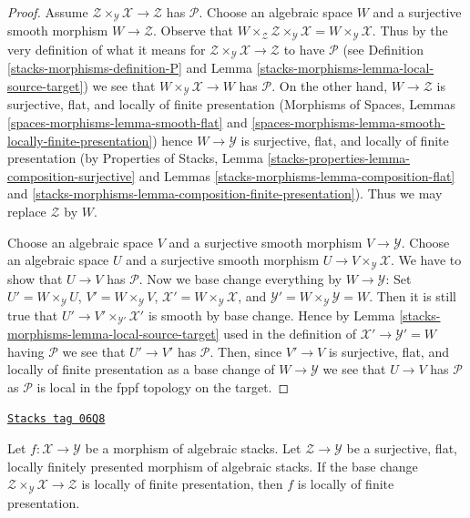 \begin{proof}
Assume $\mathcal{Z} \times_\mathcal{Y} \mathcal{X} \to \mathcal{Z}$
has $\mathcal{P}$. Choose an algebraic space $W$ and a surjective
smooth morphism $W \to \mathcal{Z}$. Observe that
$W \times_\mathcal{Z} \mathcal{Z} \times_\mathcal{Y} \mathcal{X} =
W \times_\mathcal{Y} \mathcal{X}$. Thus by the very definition of
what it means for $\mathcal{Z} \times_\mathcal{Y} \mathcal{X} \to \mathcal{Z}$
to have $\mathcal{P}$ (see Definition \ref{stacks-morphisms-definition-P}
and Lemma \ref{stacks-morphisms-lemma-local-source-target})
we see that $W \times_\mathcal{Y} \mathcal{X} \to W$
has $\mathcal{P}$. On the other hand, $W \to \mathcal{Z}$
is surjective, flat, and locally of finite presentation
(Morphisms of Spaces, Lemmas
\ref{spaces-morphisms-lemma-smooth-flat} and
\ref{spaces-morphisms-lemma-smooth-locally-finite-presentation})
hence $W \to \mathcal{Y}$ is surjective, flat, and locally of finite
presentation (by
Properties of Stacks, Lemma
\ref{stacks-properties-lemma-composition-surjective}
and
Lemmas \ref{stacks-morphisms-lemma-composition-flat} and
\ref{stacks-morphisms-lemma-composition-finite-presentation}).
Thus we may replace $\mathcal{Z}$ by $W$.

\medskip\noindent
Choose an algebraic space $V$ and a surjective smooth morphism
$V \to \mathcal{Y}$. Choose an algebraic space $U$ and a surjective
smooth morphism $U \to V \times_\mathcal{Y} \mathcal{X}$.
We have to show that $U \to V$ has $\mathcal{P}$.
Now we base change everything by $W \to \mathcal{Y}$: Set
$U' = W \times_\mathcal{Y} U$,
$V' = W \times_\mathcal{Y} V$,
$\mathcal{X}' = W \times_\mathcal{Y} \mathcal{X}$,
and $\mathcal{Y}' = W \times_\mathcal{Y} \mathcal{Y} = W$.
Then it is still true that $U' \to V' \times_{\mathcal{Y}'} \mathcal{X}'$
is smooth by base change. Hence by Lemma \ref{stacks-morphisms-lemma-local-source-target}
used in the definition of $\mathcal{X}' \to \mathcal{Y}' = W$
having $\mathcal{P}$ we see that $U' \to V'$ has $\mathcal{P}$.
Then, since $V' \to V$ is surjective, flat, and locally of finite presentation
as a base change of $W \to \mathcal{Y}$ we see that $U \to V$
has $\mathcal{P}$ as $\mathcal{P}$ is local in the fppf topology
on the target.
\end{proof}

\begin{lemma}
\label{stacks-morphisms-lemma-descent-finite-presentation}
\href{https://stacks.math.columbia.edu/tag/06Q8}{\texttt{Stacks tag 06Q8}}

Let $f : \mathcal{X} \to \mathcal{Y}$ be a morphism of algebraic stacks.
Let $\mathcal{Z} \to \mathcal{Y}$ be a surjective, flat, locally finitely
presented morphism of algebraic stacks. If the base change
$\mathcal{Z} \times_\mathcal{Y} \mathcal{X} \to \mathcal{Z}$
is locally of finite presentation, then $f$ is locally of finite
presentation.
\end{lemma}

